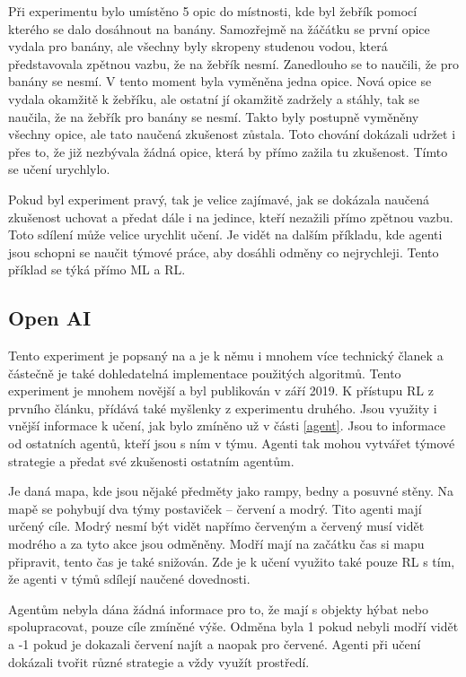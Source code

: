 \documentclass{article}
\begin{document}
Při experimentu bylo umístěno 5 opic do místnosti, kde byl žebřík pomocí kterého se dalo dosáhnout na banány. Samozřejmě na žáčátku se první opice vydala pro banány, ale všechny byly skropeny studenou vodou, která představovala zpětnou vazbu, že na žebřík nesmí. Zanedlouho se to naučili, že pro banány se nesmí. V tento moment byla vyměněna jedna opice. Nová opice se vydala okamžitě k žebříku, ale ostatní jí okamžitě zadržely a stáhly, tak se naučila, že na žebřík pro banány se nesmí. Takto byly postupně vyměněny všechny opice, ale tato naučená zkušenost zůstala. Toto chování dokázali udržet i přes to, že již nezbývala žádná opice, která by přímo zažila tu zkušenost. Tímto se učení urychlylo.

Pokud byl experiment pravý, tak je velice zajímavé, jak se dokázala naučená zkušenost uchovat a předat dále i na jedince, kteří nezažili přímo zpětnou vazbu. Toto sdílení může velice urychlit učení. Je vidět na dalším příkladu, kde agenti jsou schopni se naučit týmové práce, aby dosáhli odměny co nejrychleji. Tento příklad se týká přímo ML a RL.


\subsection{Open AI}
\label{openai}
Tento experiment je popsaný na \cite{openAI} a je k němu i mnohem více technický članek \cite{baker2019emergent} a částečně je také dohledatelná implementace použitých algoritmů. Tento experiment je mnohem novější a byl publikován v září 2019. K přístupu RL z prvního článku, přídává také myšlenky z experimentu druhého. Jsou využity i vnější informace k učení, jak bylo zmíněno už v části \ref{agent}. Jsou to informace od ostatních agentů, kteří jsou s ním v týmu. Agenti tak mohou vytvářet týmové strategie a předat své zkušenosti ostatním agentům. 

Je daná mapa, kde jsou nějaké předměty jako rampy, bedny a posuvné stěny. Na mapě se pohybují dva týmy postaviček -- červení a modrý. Tito agenti mají určený cíle. Modrý nesmí být vidět napřímo červeným a červený musí vidět modrého a za tyto akce jsou odměněny. Modří mají na začátku čas si mapu připravit, tento čas je také snižován. Zde je k učení využito také pouze RL s tím, že agenti v týmů sdílejí naučené dovednosti. 

Agentům nebyla dána žádná informace pro to, že mají s objekty hýbat nebo spolupracovat, pouze cíle zmíněné výše. Odměna byla 1 pokud nebyli modří vidět a -1 pokud je dokazali červení najít a naopak pro červené. Agenti při učení dokázali tvořit různé strategie a vždy využít prostředí. 
\end{document}
